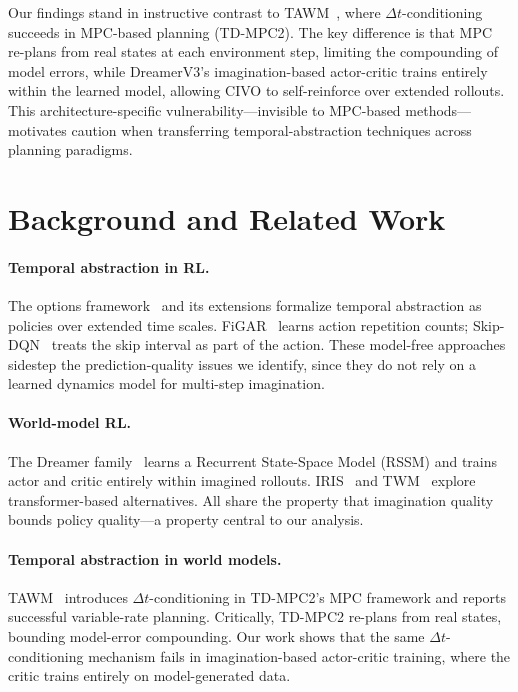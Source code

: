 \documentclass[10pt,letterpaper]{article}
\newcommand{\dt}{\Delta t}
\begin{document}
Our findings stand in instructive contrast to TAWM~\citep{nhu2025tawm}, where $\dt$-conditioning succeeds in MPC-based planning (TD-MPC2).
The key difference is that MPC re-plans from real states at each environment step, limiting the compounding of model errors, while DreamerV3's imagination-based actor-critic trains entirely within the learned model, allowing CIVO to self-reinforce over extended rollouts.
This architecture-specific vulnerability---invisible to MPC-based methods---motivates caution when transferring temporal-abstraction techniques across planning paradigms.

\section{Background and Related Work}

\paragraph{Temporal abstraction in RL.}
The options framework~\citep{sutton1999options} and its extensions formalize temporal abstraction as policies over extended time scales.
FiGAR~\citep{sharma2017figar} learns action repetition counts; Skip-DQN~\citep{dabney2021skipdqn} treats the skip interval as part of the action.
These model-free approaches sidestep the prediction-quality issues we identify, since they do not rely on a learned dynamics model for multi-step imagination.

\paragraph{World-model RL.}
The Dreamer family~\citep{hafner2020dream,hafner2021dreamerv2,hafner2023dreamerv3} learns a Recurrent State-Space Model (RSSM) and trains actor and critic entirely within imagined rollouts.
IRIS~\citep{micheli2023iris} and TWM~\citep{robine2023twm} explore transformer-based alternatives.
All share the property that imagination quality bounds policy quality---a property central to our analysis.

\paragraph{Temporal abstraction in world models.}
TAWM~\citep{nhu2025tawm} introduces $\dt$-conditioning in TD-MPC2's MPC framework and reports successful variable-rate planning.
Critically, TD-MPC2 re-plans from real states, bounding model-error compounding.
Our work shows that the same $\dt$-conditioning mechanism fails in imagination-based actor-critic training, where the critic trains entirely on model-generated data.
\end{document}
